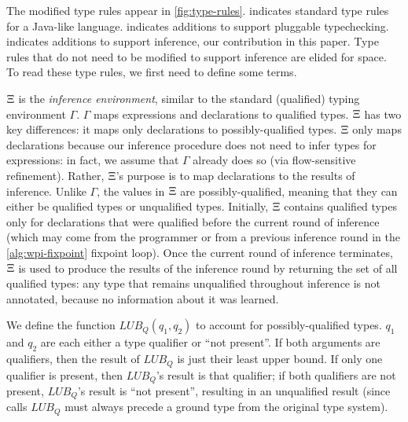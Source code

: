 The modified type rules appear in \cref{fig:type-rules}.  indicates
standard type rules for a Java-like language.  indicates additions to support
pluggable typechecking.  indicates additions to support inference, \ie our
contribution in this paper.
%
Type rules that do not need to be modified to support inference are elided for space.
%
To read these type rules, we first need to define some terms.

$\Xi$ is the \emph{inference environment}, similar to the standard (qualified)
typing environment $\Gamma$. $\Gamma$ maps expressions and declarations to qualified types.
$\Xi$ has two key differences: it maps only declarations to possibly-qualified types.
$\Xi$ only maps declarations because our inference procedure does not need to infer
types for expressions: in fact, we assume that $\Gamma$ already does so (via flow-sensitive
refinement). Rather, $\Xi$'s purpose is to map declarations to the results of inference.
Unlike $\Gamma$, the values in $\Xi$ are possibly-qualified, meaning that they can either
be qualified types or unqualified types. Initially, $\Xi$ contains qualified types only
for declarations that were qualified before the current round of inference (which may come from
the programmer or from a previous inference round in the \cref{alg:wpi-fixpoint} fixpoint loop).
Once the current round of inference terminates, $\Xi$ is used to produce the results of the
inference round by returning the set of all qualified types: any type that remains unqualified
throughout inference is not annotated, because no information about it was learned.

We define the function $\mathit{LUB_Q}(q_1, q_2)$ to account for possibly-qualified types.
$q_1$ and $q_2$ are each either a type qualifier or ``not present''.
If both arguments are qualifiers, then the result of $\mathit{LUB_Q}$
is just their least upper bound. If only one qualifier is present, then $\mathit{LUB_Q}$'s result
is that qualifier; if both qualifiers are not present, $\mathit{LUB_Q}$'s result is ``not present'',
resulting in an unqualified result (since calls $\mathit{LUB_Q}$ must always precede a ground type
from the original type system).

